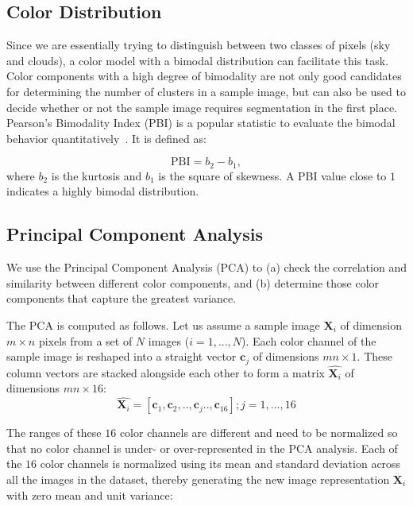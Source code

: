 \subsection{Color Distribution}
\label{sec:PBI}
Since we are essentially trying to distinguish between two classes of pixels (sky and clouds), a color model with a bimodal distribution can facilitate this task.  Color components with a high degree of bimodality are not only good candidates for determining the number of clusters in a sample image, but can also be used to decide whether or not the sample image requires segmentation in the first place. Pearson's Bimodality Index (PBI) is a popular statistic to evaluate the bimodal behavior quantitatively~\cite{pearson}. It is defined as:

\begin{equation}
\label{eq:pbi_defn}
\mbox{PBI}= b_2-b_1,
\end{equation}
where $b_{2}$ is the kurtosis and $b_{1}$ is the square of skewness.  A PBI value close to $1$ indicates a highly bimodal distribution.


\subsection{Principal Component Analysis}
\label{sec:PCA}
We use the Principal Component Analysis (PCA) to (a) check the correlation and similarity between different color components, and (b) determine those color components that capture the greatest variance.  

The PCA is computed as follows.  Let us assume a sample image $\textbf{X}_{i}$ of dimension $m \times n$ pixels from a set of $N$ images ($i=1,...,N$).  Each color channel of the sample image is reshaped into a straight vector $\textbf{c}_{j}$ of dimensions $mn \times 1$. These column vectors are stacked alongside each other to form a matrix $\hat{\textbf{X}_{i}}$ of dimensions $mn \times 16$:
\begin{equation}
\label{eq:eq1}
\hat{\textbf{X}_{i}}=[\textbf{c}_{1}, \textbf{c}_{2},..,\textbf{c}_{j}..,\textbf{c}_{16}] ; j=1,...,16
\end{equation}

The ranges of these $16$ color channels are different and need to be normalized so that no color channel is under- or over-represented in the PCA analysis. Each of the $16$ color channels is normalized using its mean and standard deviation across all the images in the dataset, thereby generating the new image representation $\ddot{\textbf{X}_{i}}$ with zero mean and unit variance:


